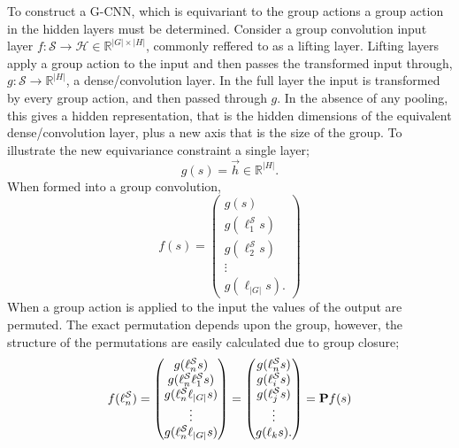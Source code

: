 To construct a G-CNN, which is equivariant to the group actions a group action in the hidden layers must be determined. Consider a group convolution input layer $f : \mathcal{S} \rightarrow \mathcal{H} \in \mathbb{R}^{|G| \times |H|}$, commonly reffered to as a lifting layer. Lifting layers apply a group action to the input and then passes the transformed input through, $ g: \mathcal{S} \rightarrow \mathbb{R}^{|H|}$, a dense/convolution layer. In the full layer the input is transformed by every group action, and then passed through $g$. In the absence of any pooling, this gives a hidden representation, that is the hidden dimensions of the equivalent dense/convolution layer, plus a new axis that is the size of the group. To illustrate the new equivariance constraint a single layer;
\begin{equation}
	g(s) = \vec{h} \in \mathbb{R}^{|H|}.
\end{equation}
When formed into a group convolution,
\begin{equation}
	f(s) = \begin{pmatrix}
		g(s)                   \\
		g(\ell_1^\mathcal{S}s) \\
		g(\ell^\mathcal{S}_2s) \\
		\vdots                 \\
		g(\ell_{|G|}s).
	\end{pmatrix}
\end{equation}
When a group action is applied to the input the values of the output are permuted. The exact permutation depends upon the group, however, the structure of the permutations are easily calculated due to group closure;
\begin{equation}
	f(\ell_n^\mathcal{S}) = \begin{pmatrix}
		g(\ell_n^\mathcal{S}s)                   \\
		g(\ell_n^\mathcal{S}\ell_1^\mathcal{S}s) \\
		g(\ell_n^\mathcal{S}\ell_{|G|}s)         \\
		\vdots                                   \\
		g(\ell_n^\mathcal{S}\ell_{|G|}s)         \\
	\end{pmatrix}
	= \begin{pmatrix}
		g(\ell_n^\mathcal{S}s) \\
		g(\ell_i^\mathcal{S}s) \\
		g(\ell^\mathcal{S}_js) \\
		\vdots                 \\
		g(\ell_{k}s).
	\end{pmatrix}
	= \mathbf{P} f(s)
\end{equation}
